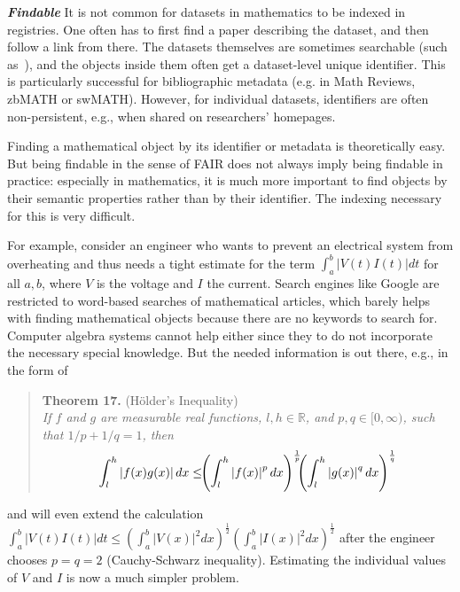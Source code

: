 \medskip

\textbf{\emph{Findable}}
It is not common for datasets in mathematics to be indexed in registries.
One often has to first find a paper describing the dataset, and then follow a link from there.
The datasets themselves are sometimes searchable (such as~\cite{OEIS:on, hog}),
and the objects inside them often get a dataset-level unique identifier.
This is particularly successful for bibliographic metadata (e.g. in Math Reviews, zbMATH or swMATH).
However, for individual datasets, identifiers are often non-persistent, e.g., when shared on researchers' homepages.

Finding a mathematical object by its identifier or metadata is theoretically easy.
But being findable in the sense of FAIR does not always imply being findable in practice:
especially in mathematics, it is much more important to find objects by their semantic properties rather than by their identifier.
The indexing necessary for this is very difficult.

For example, consider an engineer who wants to prevent an electrical system from overheating and thus needs a tight estimate for the term $\int_a^b |V(t)I(t)| dt$ for all $a,b$, where $V$ is the voltage and $I$ the current.
Search engines like Google are restricted to word-based searches of mathematical articles, which barely helps with finding mathematical objects because there are no keywords to search for.
Computer algebra systems cannot help either since they to do not incorporate the necessary special knowledge.
But the needed information is out there, e.g., in the form of
\begin{quote}
  \textbf{Theorem 17.} (H\"older's Inequality)\\\it
  If $f$ and $g$ are measurable real functions, $l,h\in\mathbb{R}$, and  $p,q\in
  [0,\infty)$, such that $1/p + 1/q = 1$, then 
  \begin{equation}\label{eq:hi}
  \int_l^h \left|f(x)g(x)\right| dx \leq\kern-.4em 
    \left(\int_l^h\left|f(x)\right|^p dx\right)^\frac{1}{p} 
    \kern-.5em
    \left(\int_l^h\left|g(x)\right|^q dx \right)^\frac{1}{q}
  \end{equation}
\end{quote}
and will even extend the calculation
$\int_a^b |V(t)I(t)| dt\leq\left(\int_a^b\left|V(x)\right|^2 dx\right)^{\frac12}
\left(\int_a^b\left|I(x)\right|^2 dx\right)^{\frac12}$
after the engineer chooses $p=q=2$ (Cauchy-Schwarz inequality).
Estimating the individual values of $V$ and $I$ is now a much simpler problem.

